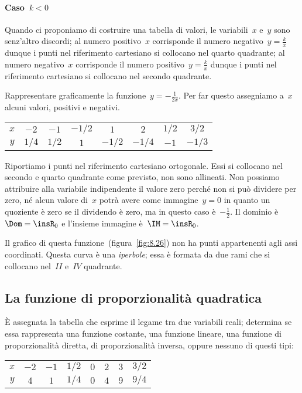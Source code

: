 \paragraph{Caso~$k<0$} Quando ci proponiamo di costruire una tabella di valori, le variabili~$x$ e~$y$ sono senz'altro discordi;
al numero positivo~$x$ corrisponde il numero negativo~$y=\frac{k}{x}$ dunque i punti nel riferimento cartesiano si
collocano nel quarto quadrante; al numero negativo~$x$ corrisponde il numero positivo~$y=\frac{k}{x}$ dunque i
punti nel riferimento cartesiano si collocano nel secondo quadrante.
\begin{exrig}
 \begin{esempio}
Rappresentare graficamente la funzione~$y=-\frac{1}{2x}$.
Per far questo assegniamo a~$x$ alcuni valori, positivi e negativi.
\begin{center}
 \begin{tabular}{cccccccc}
 \toprule
 $x$ & $-2$ & $-1$ & $-1/2$ & $1$ & $2$& $1/2$ & $3/2$\\
 $y$ & $1/4$ & $1/2$ & $1$ & $-1/2$ & $-1/4$& $-1$ & $-1/3$\\
 \bottomrule
 \end{tabular}
\end{center}
Riportiamo i punti nel riferimento cartesiano ortogonale. Essi si collocano nel secondo e quarto quadrante come previsto,
non sono allineati. Non possiamo attribuire alla variabile indipendente il valore zero perché non si può dividere per zero,
né alcun valore di~$x$ potrà avere come immagine~$y=0$ in quanto un quoziente è zero se il dividendo è zero, ma
in questo caso è~$-\frac{1}{2}$.
Il dominio è~$\Dom=\insR_{0}$ e l'insieme immagine è~$\IM=\insR_{0}$. 

Il grafico di questa funzione~(figura~\ref{fig:8.26}) non ha punti appartenenti agli assi coordinati.
Questa curva è una \emph{iperbole}; essa è formata da due rami che si collocano nel~$II$ e~$IV$ quadrante.
 \end{esempio}
\end{exrig}

\ovalbox{\risolvii \ref{ese:\thechapter.53}, \ref{ese:\thechapter.54}}

\subsection{La funzione di proporzionalità quadratica}
È assegnata la tabella che esprime il legame tra due variabili reali; determina se essa rappresenta una funzione costante,
una funzione lineare, una funzione di proporzionalità diretta, di proporzionalità inversa, oppure nessuno di questi tipi:
\begin{center}
 \begin{tabular}{cccccccc}
 \toprule
 $x$ & $-2$ & $-1$ & $1/2$ & $0$ & $2$& $3$ & $3/2$\\
 $y$ & $4$ & $1$ & $1/4$ & $0$ & $4$& $9$ & $9/4$\\
 \bottomrule
 \end{tabular}
\end{center}

